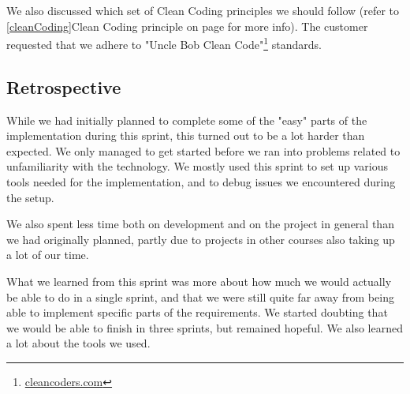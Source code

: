 We also discussed which set of Clean Coding principles we should follow (refer to \ref{cleanCoding}Clean Coding principle on page \pageref{cleanCoding} for more info). The customer requested that we adhere to "Uncle Bob Clean Code"\footnote{\href{http://cleancoders.com}{cleancoders.com}} standards.

\subsection{Retrospective}
While we had initially planned to complete some of the "easy" parts of the implementation during this sprint, this turned out to be a lot harder than expected. We only managed to get started before we ran into problems related to unfamiliarity with the technology. We mostly used this sprint to set up various tools needed for the implementation, and to debug issues we encountered during the setup.

We also spent less time both on development and on the project in general than we had originally planned, partly due to projects in other courses also taking up a lot of our time.

What we learned from this sprint was more about how much we would actually be able to do in a single sprint, and that we were still quite far away from being able to implement specific parts of the requirements. We started doubting that we would be able to finish in three sprints, but remained hopeful. We also learned a lot about the tools we used.
